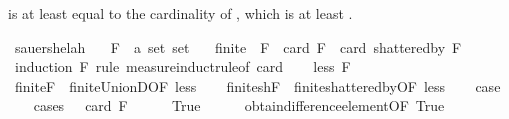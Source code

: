 \begin{isabellebody}
\begin{isamarkuptext}
      is at least equal to the cardinality of , which is at least .%
\end{isamarkuptext}\isamarkuptrue%
\isamarkupfalse%
\ sauer{\isacharunderscore}{\kern0pt}shelah{\isacharunderscore}{\kern0pt}{}{\isacharcolon}{\kern0pt}\isanewline
\ \ \ F\ {\isacharcolon}{\kern0pt}{\isacharcolon}{\kern0pt}\ {\isachardoublequoteopen}{\isacharprime}{\kern0pt}a\ set\ set{\isachardoublequoteclose}\isanewline
\ \ \ {\isachardoublequoteopen}finite\ {\isacharparenleft}{\kern0pt}{\isasymUnion}\ F{\isacharparenright}{\kern0pt}\ {\isasymLongrightarrow}\ card\ F\ {\isasymle}\ card\ {\isacharparenleft}{\kern0pt}shattered{\isacharunderscore}{\kern0pt}by\ F{\isacharparenright}{\kern0pt}{\isachardoublequoteclose}\isanewline
%
\isadelimproof
%
\endisadelimproof
%
\isatagproof
{}\isamarkupfalse%
\ {\isacharparenleft}{\kern0pt}induction\ F\ rule{\isacharcolon}{\kern0pt}\ measure{\isacharunderscore}{\kern0pt}induct{\isacharunderscore}{\kern0pt}rule{\isacharbrackleft}{\kern0pt}of\ {\isachardoublequoteopen}card{\isachardoublequoteclose}{\isacharbrackright}{\kern0pt}{\isacharparenright}{\kern0pt}\isanewline
\ \ \isamarkupfalse%
\ {\isacharparenleft}{\kern0pt}less\ F{\isacharparenright}{\kern0pt}\isanewline
\ \ \isamarkupfalse%
\ finite{\isacharunderscore}{\kern0pt}F\ {\isacharequal}{\kern0pt}\ finite{\isacharunderscore}{\kern0pt}UnionD{\isacharbrackleft}{\kern0pt}OF\ less{\isacharparenleft}{\kern0pt}{}{\isacharparenright}{\kern0pt}{\isacharbrackright}{\kern0pt}\isanewline
\ \ \isamarkupfalse%
\ finite{\isacharunderscore}{\kern0pt}shF\ {\isacharequal}{\kern0pt}\ finite{\isacharunderscore}{\kern0pt}shattered{\isacharunderscore}{\kern0pt}by{\isacharbrackleft}{\kern0pt}OF\ less{\isacharparenleft}{\kern0pt}{}{\isacharparenright}{\kern0pt}{\isacharbrackright}{\kern0pt}\isanewline
\ \ \isamarkupfalse%
\ {\isacharquery}{\kern0pt}case\isanewline
\ \ \isamarkupfalse%
\ {\isacharparenleft}{\kern0pt}cases\ {\isachardoublequoteopen}{}\ {\isasymle}\ card\ F{\isachardoublequoteclose}{\isacharparenright}{\kern0pt}\isanewline
\ \ \ \ \isamarkupfalse%
\ True\isanewline
\ \ \ \ \isamarkupfalse%
\ obtain{\isacharunderscore}{\kern0pt}difference{\isacharunderscore}{\kern0pt}element{\isacharbrackleft}{\kern0pt}OF\ True{\isacharbrackright}{\kern0pt}\ \isanewline

\end{isabellebody}
